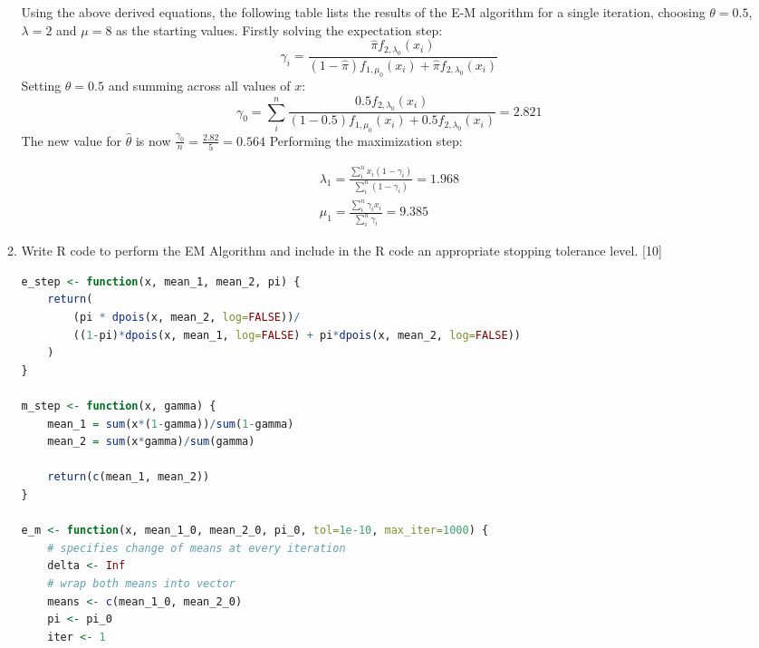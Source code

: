 \documentclass{article}
\begin{document}
\begin{enumerate}
\begin{enumerate}
                Using the above derived equations, the following table lists the results of the E-M algorithm for a single iteration, choosing $\theta = 0.5$, $\lambda=2$ and $\mu=8$ as the starting values.
                Firstly solving the expectation step:
                \begin{equation*}
                    \gamma_i = \frac{\hat{\pi}f_{2, \lambda_{0}}(x_i)}{(1-\hat{\pi})f_{1, \mu_{0}}(x_i) + \hat{\pi}f_{2, \lambda_{0}}(x_i)}
                \end{equation*}
                Setting $\theta = 0.5$ and summing across all values of $x$:
                \begin{equation*}
                    \gamma_0 = \sum_{i}^{n}\frac{0.5f_{2, \lambda_{0}}(x_i)}{(1-0.5)f_{1, \mu_{0}}(x_i) + 0.5f_{2, \lambda_{0}}(x_i)} = 2.821
                \end{equation*}
                The new value for $\hat{\theta}$ is now $\frac{\gamma_{0}}{n} = \frac{2.82}{5} = 0.564$ 
                Performing the maximization step:
                
                \begin{equation*}
                    \begin{gathered}
                        \lambda_1 = \frac{\sum_{i}^{n}x_i(1-\gamma_i)}{\sum_{i}^{n}(1-\gamma_i)} = 1.968\\
                        \mu_1 =  \frac{\sum_i^{n}\gamma_ix_i}{\sum_i^{n}\gamma_{i}} = 9.385
                    \end{gathered}
                \end{equation*}
                \item Write R code to perform the EM Algorithm and include in the R code an appropriate stopping 
tolerance level. \hfill[10]


                \begin{lstlisting}[language=R]
e_step <- function(x, mean_1, mean_2, pi) {
    return(
        (pi * dpois(x, mean_2, log=FALSE))/
        ((1-pi)*dpois(x, mean_1, log=FALSE) + pi*dpois(x, mean_2, log=FALSE))
    )
}

m_step <- function(x, gamma) {
    mean_1 = sum(x*(1-gamma))/sum(1-gamma)
    mean_2 = sum(x*gamma)/sum(gamma)

    return(c(mean_1, mean_2))
}

e_m <- function(x, mean_1_0, mean_2_0, pi_0, tol=1e-10, max_iter=1000) {
    # specifies change of means at every iteration
    delta <- Inf
    # wrap both means into vector
    means <- c(mean_1_0, mean_2_0)
    pi <- pi_0
    iter <- 1
    

\end{lstlisting}
\end{enumerate}
\end{enumerate}
\end{document}
